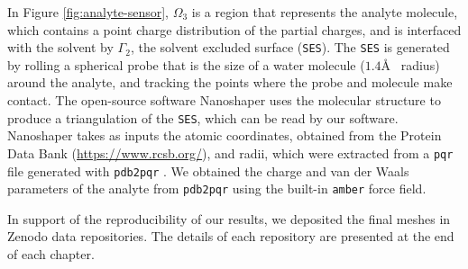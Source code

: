 In Figure \ref{fig:analyte-sensor}, $\Omega_3$ is a region that represents the analyte molecule, which contains a point charge distribution 
of the partial charges, and is interfaced with the solvent by $\Gamma_2$, the solvent excluded surface (\texttt{SES}).
The \texttt{SES} is generated by rolling a spherical probe that is the size of a water molecule ($1.4$\AA~ radius) around the analyte, and tracking 
the points where the probe and molecule make contact.
The open-source software Nanoshaper \cite{Nanoshaper} uses the molecular structure to produce a triangulation of the \texttt{SES}, which can be 
read by our software. Nanoshaper takes as inputs the atomic coordinates, obtained from the Protein Data Bank (\url{https://www.rcsb.org/}),
and radii, which were extracted from a \texttt{pqr} file generated with \texttt{pdb2pqr} \cite{Dolinsky04}.
We obtained the charge and van der Waals parameters of the analyte from \texttt{pdb2pqr} using the built-in \texttt{amber} force field.

In support of the reproducibility of our results, we deposited the final meshes in Zenodo data repositories. The details of each repository 
are presented at the end of each chapter. 
